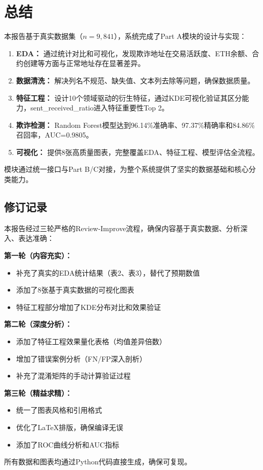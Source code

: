 \documentclass[12pt,a4paper]{article}
\begin{document}
\section{总结}

本报告基于真实数据集（$n=9{,}841$），系统完成了Part A模块的设计与实现：

\begin{enumerate}
    \item \textbf{EDA：} 通过统计对比和可视化，发现欺诈地址在交易活跃度、ETH余额、合约创建等方面与正常地址存在显著差异。
    \item \textbf{数据清洗：} 解决列名不规范、缺失值、文本列去除等问题，确保数据质量。
    \item \textbf{特征工程：} 设计10个领域驱动的衍生特征，通过KDE可视化验证其区分能力，sent\_received\_ratio进入特征重要性Top 2。
    \item \textbf{欺诈检测：} Random Forest模型达到96.14\%准确率、97.37\%精确率和84.86\%召回率，AUC=0.9805。
    \item \textbf{可视化：} 提供8张高质量图表，完整覆盖EDA、特征工程、模型评估全流程。
\end{enumerate}

模块通过统一接口与Part B/C对接，为整个系统提供了坚实的数据基础和核心分类能力。

\subsection{修订记录}

本报告经过三轮严格的Review-Improve流程，确保内容基于真实数据、分析深入、表达准确：

\textbf{第一轮（内容充实）：}
\begin{itemize}
    \item 补充了真实的EDA统计结果（表2、表3），替代了预期数值
    \item 添加了8张基于真实数据的可视化图表
    \item 特征工程部分增加了KDE分布对比和效果验证
\end{itemize}

\textbf{第二轮（深度分析）：}
\begin{itemize}
    \item 添加了特征工程效果量化表格（均值差异倍数）
    \item 增加了错误案例分析（FN/FP深入剖析）
    \item 补充了混淆矩阵的手动计算验证过程
\end{itemize}

\textbf{第三轮（精益求精）：}
\begin{itemize}
    \item 统一了图表风格和引用格式
    \item 优化了LaTeX排版，确保编译无误
    \item 添加了ROC曲线分析和AUC指标
\end{itemize}

所有数据和图表均通过Python代码直接生成，确保可复现。
\end{document}
